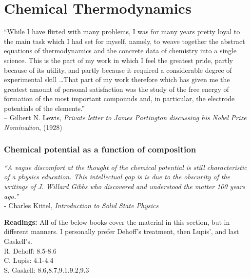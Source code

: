 \documentclass[12pt]{article}
\begin{document}
\part{Chemical Thermodynamics}
\vspace*{\fill}
\begin{center}
``While I have flirted with many problems, I was for
many years pretty loyal to the main task which I had
set for myself, namely, to weave together the abstract
equations of thermodynamics and the concrete data of
chemistry into a single science. This is the part of my
work in which I feel the greatest pride, partly because
of its utility, and partly because it required a considerable
degree of experimental skill \dots That part of my
work therefore which has given me the greatest amount
of personal satisfaction was the study of the free energy
of formation of the most important compounds and, in
particular, the electrode potentials of the elements.'' \\
--  Gilbert N. Lewis, \textit{Private letter to James Partington discussing his Nobel Prize Nomination}, (1928)\\

\end{center}
\vfill %
\clearpage

\section{Chemical potential as a function of composition}
\begin{center}
\emph{``A vague discomfort at the thought of the chemical potential is still characteristic of a physics education. This intellectual gap is is due to the obscurity of the writings of J. Willard Gibbs who discovered and understood the matter 100 years ago.''} \\ - Charles Kittel, \textit{Introduction to Solid State Physics}
\end{center}
\textbf{Readings:} All of the below books cover the material in this section, but in different manners. I personally prefer Dehoff's treatment, then Lupis', and last Gaskell's.\\
R. Dehoff: 8.5-8.6\\
C. Lupis: 4.1-4.4\\
S. Gaskell: 8.6,8.7,9.1.9.2,9.3
\end{document}
